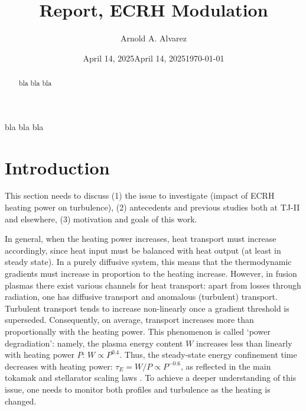 \documentclass[preprint,12pt,authoryear]{elsarticle}
\date{April 14, 2025}
\begin{document}
\begin{frontmatter}
%
\title{Report, ECRH Modulation}
\date{April 14, 2025}
\author{Arnold A. Alvarez}%

%        
%
\date{\today}
%
\begin{abstract}
    bla bla bla 
\end{abstract}

\begin{keyword}
    bla bla bla
\end{keyword}
%
\end{frontmatter}

\section{Introduction}




This section needs to discuss (1) the issue to investigate (impact of ECRH heating power on turbulence), (2) antecedents and previous studies both at TJ-II and elsewhere, (3) motivation and goals of this work.

In general, when the heating power increases, heat transport must increase accordingly, since heat input must be balanced with heat output (at least in steady state). In a purely diffusive system, this means that the thermodynamic gradients must increase in proportion to the heating increase.
However, in fusion plasmas there exist various channels for heat transport: apart from losses through radiation, one has diffusive transport and anomalous (turbulent) transport. Turbulent transport tends to increase non-linearly once a gradient threshold is superseded.
Consequently, on average, transport increases more than proportionally with the heating power.
This phenomenon is called `power degradiation': namely, the plasma energy content $W$ increases less than linearly with heating power $P$: $W \propto P^{0.4}$. 
Thus, the steady-state energy confinement time decreases with heating power: $\tau_E = W/P \propto P^{-0.6}$, as reflected in the main tokamak and stellarator scaling laws \cite{ITER:2007,Yamada:2005}.
To achieve a deeper understanding of this issue, one needs to monitor both profiles and turbulence as the heating is changed.
\end{document}
